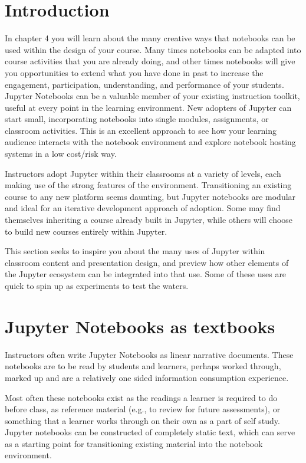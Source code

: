 \documentclass[]{book}
\begin{document}
\section{Introduction}\label{introduction}

In chapter 4 you will learn about the many creative ways that notebooks
can be used within the design of your course. Many times notebooks can
be adapted into course activities that you are already doing, and other
times notebooks will give you opportunities to extend what you have done
in past to increase the engagement, participation, understanding, and
performance of your students. Jupyter Notebooks can be a valuable member
of your existing instruction toolkit, useful at every point in the
learning environment. New adopters of Jupyter can start small,
incorporating notebooks into single modules, assignments, or classroom
activities. This is an excellent approach to see how your learning
audience interacts with the notebook environment and explore notebook
hosting systems in a low cost/risk way.

Instructors adopt Jupyter within their classrooms at a variety of
levels, each making use of the strong features of the environment.
Transitioning an existing course to any new platform seems daunting, but
Jupyter notebooks are modular and ideal for an iterative development
approach of adoption. Some may find themselves inheriting a course
already built in Jupyter, while others will choose to build new courses
entirely within Jupyter.

This section seeks to inspire you about the many uses of Jupyter within
classroom content and presentation design, and preview how other
elements of the Jupyter ecosystem can be integrated into that use. Some
of these uses are quick to spin up as experiments to test the waters.

\section{Jupyter Notebooks as
textbooks}\label{jupyter-notebooks-as-textbooks}

Instructors often write Jupyter Notebooks as linear narrative documents.
These notebooks are to be read by students and learners, perhaps worked
through, marked up and are a relatively one sided information
consumption experience.

Most often these notebooks exist as the readings a learner is required
to do before class, as reference material (e.g., to review for future
assessments), or something that a learner works through on their own as
a part of self study. Jupyter notebooks can be constructed of completely
static text, which can serve as a starting point for transitioning
existing material into the notebook environment.
\end{document}
